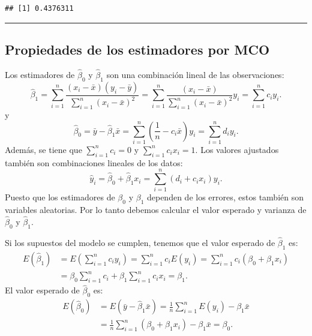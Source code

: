 \documentclass[
]{article}
\begin{document}
\begin{verbatim}
## [1] 0.4376311
\end{verbatim}

\rule{\textwidth}{0.4pt}

\hypertarget{propiedades-de-los-estimadores-por-mco}{%
\subsection{Propiedades de los estimadores por MCO}\label{propiedades-de-los-estimadores-por-mco}}

Los estimadores de \(\widehat{\beta}_{0}\) y \(\widehat{\beta}_{1}\) son una combinación lineal de las observaciones:
\begin{equation}
\widehat{\beta}_{1} = \sum_{i=1}^{n} \frac{(x_{i}-\bar{x})(y_{i}-\bar{y})}{\sum_{i=1}^{n}(x_{i}-\bar{x})^2} = \sum_{i=1}^{n} \frac{(x_{i}-\bar{x})}{\sum_{i=1}^{n}(x_{i}-\bar{x})^2}y_{i} = \sum_{i=1}^{n}c_{i}y_{i}.
\label{eq:beta1cl}
\end{equation}
y
\[
\widehat{\beta}_{0} = \bar{y} - \widehat{\beta}_{1}\bar{x} = \sum_{i=1}^{n}\left( \frac{1}{n} - c_{i}\bar{x} \right)y_{i} = \sum_{i=1}^{n}d_{i}y_{i}.
\]
Además, se tiene que \(\sum_{i=1}^{n}c_{i}=0\) y \(\sum_{i=1}^{n}c_{i}x_{i}=1\). Los valores ajustados también son combinaciones lineales de los datos:
\[
\widehat{y}_{i} = \widehat{\beta}_{0} + \widehat{\beta}_{1}x_{i} = \sum_{i=1}^{n}(d_{i}+c_{i}x_{i})y_{i}.
\]
Puesto que los estimadores de \(\beta_{0}\) y \(\beta_{1}\) dependen de los errores, estos también son variables aleatorias. Por lo tanto debemos calcular el valor esperado y varianza de \(\widehat{\beta}_{0}\) y \(\widehat{\beta}_{1}\).

Si los supuestos del modelo se cumplen, tenemos que el valor esperado de \(\widehat{\beta}_{1}\) es:
\begin{equation}
\begin{split}
E(\widehat{\beta}_{1}) &= E\left( \sum_{i=1}^{n}c_{i}y_{i} \right) = \sum_{i=1}^{n}c_{i}E(y_{i}) = \sum_{i=1}^{n} c_{i}(\beta_{0} + \beta_{1}x_{i}) \\
&=\beta_{0}\sum_{i=1}^{n}c_{i} + \beta_{1}\sum_{i=1}^{n}c_{i}x_{i} = \beta_{1}.
\end{split}
\nonumber
\end{equation}
El valor esperado de \(\widehat{\beta}_{0}\) es:
\begin{equation}
\begin{split}
E(\widehat{\beta}_{0}) &= E\left(\bar{y} - \widehat{\beta}_{1}\bar{x} \right) = \frac{1}{n}\sum_{i=1}^{n}E(y_{i}) - \beta_{1}\bar{x} \\
&= \frac{1}{n}\sum_{i=1}^{n}\left(\beta_{0} + \beta_{1}x_{i}\right) - \beta_{1}\bar{x} = \beta_{0}.
\end{split}
\nonumber
\end{equation}
\end{document}
